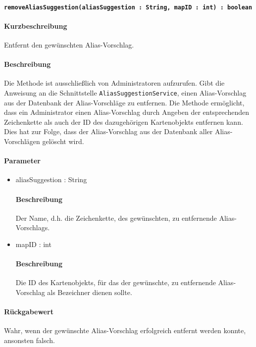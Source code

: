 \paragraph*{\texttt{removeAliasSuggestion(aliasSuggestion : String, mapID : int) : boolean}}%
\paragraph*{Kurzbeschreibung}
Entfernt den gewünschten Alias-Vorschlag.
\paragraph*{Beschreibung}
Die Methode ist ausschließlich von Administratoren aufzurufen.
Gibt die Anweisung an die Schnittstelle \texttt{AliasSuggestionService}, einen Alias-Vorschlag aus der Datenbank der Alias-Vorschläge zu entfernen.
Die Methode ermöglicht, dass ein Administrator einen Alias-Vorschlag durch Angeben der entsprechenden Zeichenkette als auch der ID des dazugehörigen Kartenobjekts entfernen kann.
Dies hat zur Folge, dass der Alias-Vorschlag aus der Datenbank aller Alias-Vorschlägen gelöscht wird.
\paragraph*{Parameter}
\begin{itemize}
	\item aliasSuggestion : String
		\paragraph*{Beschreibung}
		Der Name, d.h. die Zeichenkette, des gewünschten, zu entfernende Alias-Vorschlags.
	\item mapID : int
		\paragraph*{Beschreibung}
		Die ID des Kartenobjekts, für das der gewünschte, zu entfernende Alias-Vorschlag als Bezeichner dienen sollte.
\end{itemize}
\paragraph*{Rückgabewert}
Wahr, wenn der gewünschte Alias-Vorschlag erfolgreich entfernt werden konnte, ansonsten falsch.

